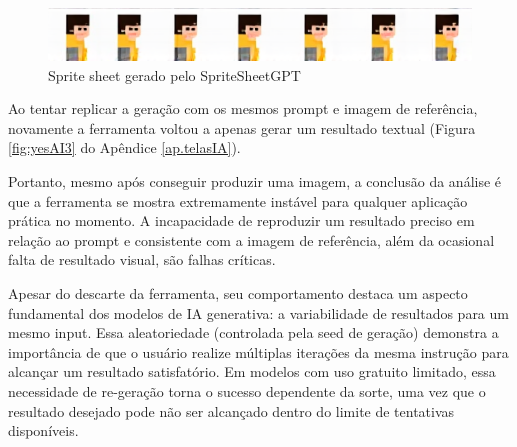 \begin{figure}[htbp]
    \centering
    \caption{\small Sprite sheet gerado pelo SpriteSheetGPT}
    \label{fig:yesAIResultado}
    \includegraphics[width=1\linewidth]{figs/yesAI/resultado.png}
\end{figure}

Ao tentar replicar a geração com os mesmos prompt e imagem de referência, novamente a ferramenta voltou a apenas gerar um resultado textual (Figura \ref{fig:yesAI3} do Apêndice \ref{ap.telasIA}).

Portanto, mesmo após conseguir produzir uma imagem, a conclusão da análise é que a ferramenta se mostra extremamente instável para qualquer aplicação prática no momento. A incapacidade de reproduzir um resultado preciso em relação ao prompt e consistente com a imagem de referência, além da ocasional falta de resultado visual, são falhas críticas. 

Apesar do descarte da ferramenta, seu comportamento destaca um aspecto fundamental dos modelos de IA generativa: a variabilidade de resultados para um mesmo input. Essa aleatoriedade (controlada pela seed de geração) demonstra a importância de que o usuário realize múltiplas iterações da mesma instrução para alcançar um resultado satisfatório. Em modelos com uso gratuito limitado, essa necessidade de re-geração torna o sucesso dependente da sorte, uma vez que o resultado desejado pode não ser alcançado dentro do limite de tentativas disponíveis.